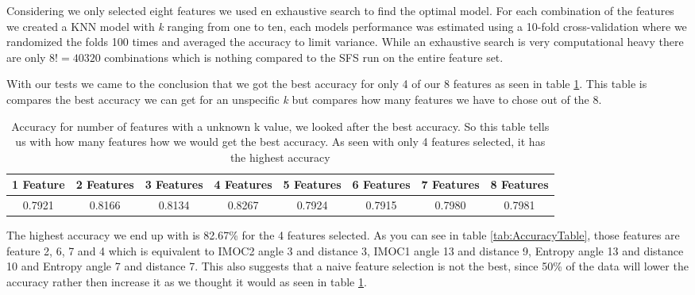 Considering we only selected eight features we used en exhaustive search to find the optimal model. For each combination of the features we created a KNN model with \emph{k} ranging from one to ten, each models performance was estimated using a 10-fold cross-validation where we randomized the folds 100 times and averaged the accuracy to limit variance. While an exhaustive search is very computational heavy there are only $8! = 40320$ combinations which is nothing compared to the SFS run on the entire feature set.

With our tests we came to the conclusion that we got the best accuracy for only 4 of our 8 features as seen in table \ref{tab:numberOfFeatures}. This table is compares the best accuracy we can get for an unspecific \textit{k} but compares how many features we have to chose out of the 8.

\begin{table}[H]
  \centering
    \begin{tabular}{|c|c|c|c|c|c|c|c|}
    1 Feature  & 2 Features & 3 Features  & 4 Features  & 5 Features  & 6 Features & 7 Features  & 8 Features \\
    \hline
    0.7921  & 0.8166  & 0.8134  & 0.8267  & 0.7924  & 0.7915 & 0.7980  & 0.7981 \\
    \hline
    \end{tabular}%
  \caption{Accuracy for number of features with a unknown k value, we looked after the best accuracy. So this table tells us with how many features how we would get the best accuracy. As seen with only 4 features selected, it has the highest accuracy}\label{tab:numberOfFeatures}%
\end{table}%

The highest accuracy we end up with is 82.67\% for the 4 features selected. As you can see in table \ref{tab:AccuracyTable}, those features are feature 2, 6, 7 and 4 which is equivalent to IMOC2 angle 3 and distance 3, IMOC1 angle 13 and distance 9, Entropy angle 13 and distance 10 and Entropy angle 7 and distance 7. This also suggests that a naive feature selection is not the best, since 50\% of the data will lower the accuracy rather then increase it as we thought it would as seen in table \ref{tab:numberOfFeatures}.


